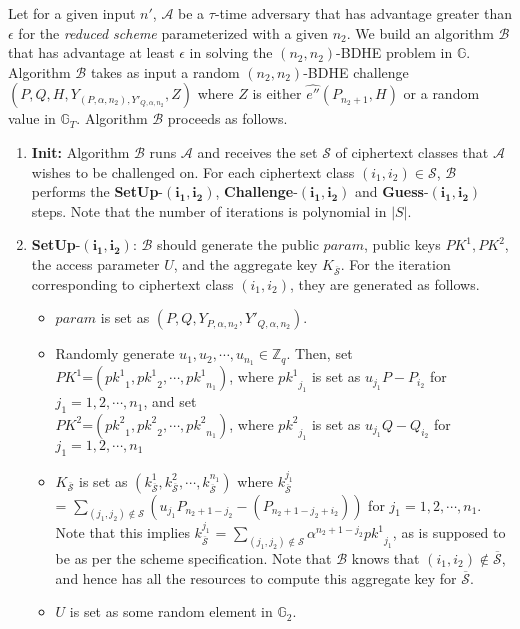 \textbf{} Let for a given input $n'$, $\mathcal{A}$ be a $\tau$-time adversary that has advantage greater than $\epsilon$ for the \emph{reduced scheme} parameterized with a given $n_2$. We build an algorithm $\mathcal{B}$ that has advantage at least $\epsilon$ in solving the $(n_2,n_2)$-BDHE problem in $\mathbb{G}$. Algorithm $\mathcal{B}$ takes as input a random $(n_2,n_2)$-BDHE challenge $(P,Q,H,Y_{(P,\alpha,n_2),Y'_{Q,\alpha,n_2}},Z)$ where $Z$ is either $\hat{e''}(P_{n_2+1},H)$ or a random value in $\mathbb{G}_T$. Algorithm $\mathcal{B}$ proceeds as follows.

\begin{enumerate}
 \item \textbf{Init:} Algorithm $\mathcal{B}$ runs $\mathcal{A}$ and receives the set $\mathcal{S}$ of ciphertext classes that $\mathcal{A}$ wishes to be challenged on. For each ciphertext class $(i_1,i_2)\in\mathcal{S}$, $\mathcal{B}$ performs the \textbf{SetUp}-$\mathbf{(i_1,i_2)}$, \textbf{Challenge}-$\mathbf{(i_1,i_2)}$ and \textbf{Guess}-$\mathbf{(i_1,i_2)}$ steps. Note that the number of iterations is polynomial in $|S|$. 
 
 \item \textbf{SetUp}-$\mathbf{(i_1,i_2)}$: $\mathcal{B}$ should generate the public $param$, public keys $PK^1,PK^2$, the access parameter $U$, and the aggregate key $K_{\overline{\mathcal{S}}}$. For the iteration corresponding to ciphertext class $(i_1,i_2)$, they are generated as follows.
 \begin{itemize}
  \item $param$ is set as $(P,Q,Y_{P,\alpha,n_2},Y'_{Q,\alpha,n_2})$.
  \item Randomly generate $u_1,u_2,\cdots,u_{n_1} \in \mathbb{Z}_q$. Then, set\\ $PK^1$=$({pk^1}_1,{pk^1}_2,\cdots,{pk^1}_{n_1})$, where ${pk^1}_{j_1}$ is set as $u_{j_1}P - P_{i_2}$ for $j_1=1,2,\cdots,n_1$, and set\\ $PK^2$=$({pk^2}_1,{pk^2}_2,\cdots,{pk^2}_{n_1})$, where ${pk^2}_{j_1}$ is set as $u_{j_1}Q - Q_{i_2}$ for $j_1=1,2,\cdots,n_1$
  \item $K_{\overline{\mathcal{S}}}$ is set as $(k^{1}_{\overline{\mathcal{S}}},k^{2}_{\overline{\mathcal{S}}},\cdots,k^{n_1}_{\overline{\mathcal{S}}})$ where $k^{j_1}_{\overline{\mathcal{S}}}$\\ = $\sum_{(j_1,j_2)\notin\mathcal{S}}({u_{j_1}}P_{n_2+1-j_2}-(P_{n_2+1-j_2+i_2}))$ for $j_1=1,2,\cdots,n_1$. Note that this implies $k^{j_1}_{\overline{\mathcal{S}}}$ = $\sum_{(j_1,j_2)\notin\mathcal{S}}\alpha^{n_2+1-j_2}{pk^{1}}_{j_1}$, as is supposed to be as per the scheme specification. Note that $\mathcal{B}$ knows that $(i_1,i_2)\notin \overline{\mathcal{S}}$, and hence has all the resources to compute this aggregate key for $\overline{\mathcal{S}}$. 
  \item $U$ is set as some random element in $\mathbb{G}_2$.
 \end{itemize}
 

\end{enumerate}
